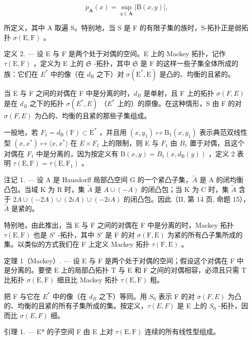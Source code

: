 \[
p _ {\mathbf {A}} (x) = \sup _ {y \in \mathbf {A}} | \mathrm{B} (x, y) |,\tag{2}
\]

所定义，其中 A 取遍 S。特别地，当 S 是 F 的有限子集的族时，S-拓扑正是弱拓扑 \(\sigma(\mathrm{E}, \mathrm{F})\) 。

定义 2. --- 设 E 与 F 是两个处于对偶的空间。E 上的 Mackey 拓扑，记作 \(\tau(\mathrm{E},\mathrm{F})\) ，定义为 E 上的 \(\mathfrak{S}\) -拓扑，其中 \(\mathfrak{S}\) 是 F 的这样一些子集全体所成的族：它们在 \(E^{*}\) 中的像（在 \(d_{\mathrm{B}}\) 之下）对 \(\sigma(\mathrm{E}^{*},\mathrm{E})\) 是凸的、均衡的且紧的。

当 E 与 F 之间的对偶在 F 中是分离的时，\(d_{B}\) 是单射，且 F 上的拓扑 \(\sigma(F, E)\) 是在 \(d_{B}\) 之下的拓扑 \(\sigma(E^{*}, E)\) （\(E^{*}\) 上的）的原像。在这种情形，S 由 F 的对 \(\sigma(F, E)\) 为凸的、均衡的且紧的那些子集组成。

一般地，若 \(F_{1}=d_{\mathrm{B}}(\mathrm{F})\subset\mathrm{E}^{*}\) ，并且用 \((x,y_{1})\mapsto\mathrm{B}_{1}(x,y_{1})\) 表示典范双线性型 \((x,x^{*})\mapsto\langle x,x^{*}\rangle\) 在 \(E\times F_{1}\) 上的限制，则 E 与 \(F_{1}\) 由 \(B_{1}\) 置于对偶，且这个对偶在 \(F_{1}\) 中是分离的，因为按定义有 \(\mathrm{B}(x,y)=B_{1}(x,d_{\mathrm{B}}(y))\) ，定义 2 表明 \(\tau(\mathrm{E},\mathrm{F})=\tau(\mathrm{E},\mathrm{F}_{1})\) 。

注记 1. --- 设 A 是 Hausdorff 局部凸空间 G 的一个紧凸子集，\(\tilde{A}\) 是 A 的闭均衡凸包。当域 K 为 R 时，集 \(\tilde{A}\) 是 \(A \cup (-A)\) 的闭凸包；当 K 为 C 时，集 \(\tilde{A}\) 含于 \(2A \cup (-2A) \cup (2iA) \cup (-2iA)\) 的闭凸包。因此（II, 第 14 页, 命题 15），\(\tilde{A}\) 是紧的。

特别地，由此推出，当 E 与 F 之间的对偶在 F 中是分离的时，Mackey 拓扑 \(\tau(\mathrm{E},\mathrm{F})\) 也是 \(S'\) -拓扑，其中 \(S'\) 是 F 的对 \(\sigma(\mathrm{F},\mathrm{E})\) 为紧的所有凸子集所成的集。以类似的方式我们在 F 上定义 Mackey 拓扑 \(\tau(\mathrm{F},\mathrm{E})\) 。

定理 1（Mackey）. --- 设 E 与 F 是两个处于对偶的空间；假设这个对偶在 F 中是分离的。要使 E 上的局部凸拓扑 T 与 E 和 F 之间的对偶相容，必须且只需 T 比拓扑 \(\sigma(\mathrm{E},\mathrm{F})\) 细且比 Mackey 拓扑 \(\tau(\mathrm{E},\mathrm{F})\) 粗。

把 F 与它在 \(E^{*}\) 中的像（在 \(d_{B}\) 之下）等同。用 \(S_{0}\) 表示 F 的对 \(\sigma(F, E)\) 为凸的、均衡的且紧的所有子集所成的集。按定义，\(\tau(E, F)\) 是 E 上的 \(S_{0}\) -拓扑，因而比 \(\sigma(E, F)\) 细。

引理 1. --- E* 的子空间 F 由 E 上对 \(\tau(\mathrm{E},\mathrm{F})\) 连续的所有线性型组成。


